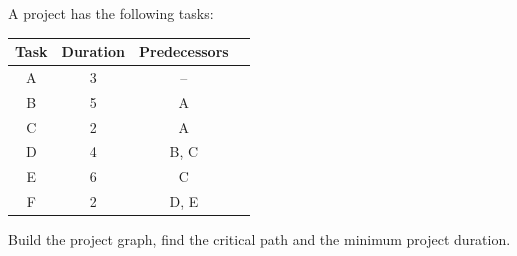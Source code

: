 \begin{exercise}
A project has the following tasks:
\begin{center}
\begin{tabular}{cccc}
  \toprule
  Task & Duration & Predecessors \\
  \midrule
  A & 3 & -- \\
  B & 5 & A \\
  C & 2 & A \\
  D & 4 & B, C \\
  E & 6 & C \\
  F & 2 & D, E \\
  \bottomrule
\end{tabular}
\end{center}
Build the project graph, find the critical path and the minimum project
duration.
\end{exercise}
